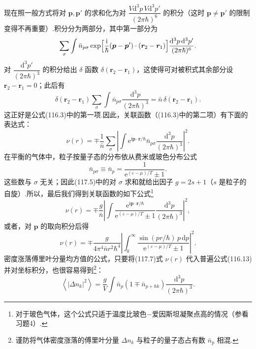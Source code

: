 现在照一般方式将对 $\boldsymbol{p},\boldsymbol{p}'$ 的求和化为对
$\dfrac{V\mathrm{d}^{3}p\,V\mathrm{d}^{3}p'}{(2\pi\hbar)^{6}}$ 的积分（这时
$\boldsymbol{p}\neq\boldsymbol{p}'$ 的限制变得不再重要）.积分分为两部分，其中第一部分为
\begin{equation*}
  \sum_{\sigma}\int\bar{n}_{p\sigma}
  \exp\Bigl[\frac{\mathrm{i}}{\hbar}
  (\boldsymbol{p}-\boldsymbol{p}')\cdot(\boldsymbol{r}_{2}-\boldsymbol{r}_{1})\Bigr]
  \frac{\mathrm{d}^{3}p\,\mathrm{d}^{3}p'}{(2\pi\hbar)^{6}}.
\end{equation*}
对 $\dfrac{\mathrm{d}^{3}p'}{(2\pi\hbar)^{3}}$ 的积分给出 $\delta$ 函数
$\delta(\boldsymbol{r}_{2}-\boldsymbol{r}_{1})$，这使得可对被积式其余部分设
$\boldsymbol{r}_{2}-\boldsymbol{r}_{1}=0$；此后有
\begin{equation*}
  \delta(\boldsymbol{r}_{2}-\boldsymbol{r}_{1})\sum_{\sigma}\int\bar{n}_{p\sigma}
  \frac{\mathrm{d}^{3}p}{(2\pi\hbar)^{3}}
  =\bar{n}\,\delta(\boldsymbol{r}_{2}-\boldsymbol{r}_{1}).
\end{equation*}
这正好是公式(116.3)中的第一项.因此，关联函数（(116.3)中的第二项）有下面的表达式：
\begin{equation}
  \nu(r)=\mp\frac{1}{\bar{n}}\sum_{\sigma}
  \left|\int\mathrm{e}^{\mathrm{i}\boldsymbol{p}\cdot\boldsymbol{r}/\hbar}
  \bar{n}_{p\sigma}\frac{\mathrm{d}^{3}p}{(2\pi\hbar)^{3}}\right|^{2}.
\end{equation}
在平衡的气体中，粒子按量子态的分布依从费米或玻色分布公式
\begin{equation}
  \bar{n}_{p\sigma}\equiv\bar{n}_{p}
  =\frac{1}{\mathrm{e}^{(\varepsilon-\mu)/T}\pm1}.
\end{equation}
这些数与 $\sigma$ 无关；因此(117.5)中的对 $\sigma$ 求和就给出因子 $g=2s+1$（$s$
是粒子的自旋）.所以，最后我们得到关联函数的如下公式\footnote{对于玻色气体，这个公式只适于温度比玻色−爱因斯坦凝聚点高的情况（参看习题4）.}
\begin{equation}
  \nu(r)=\mp\frac{g}{\bar{n}}
  \left|\int\frac{\mathrm{e}^{\mathrm{i}\boldsymbol{p}\cdot\boldsymbol{r}/\hbar}}
  {\mathrm{e}^{(\varepsilon-\mu)/T}\pm1}
  \frac{\mathrm{d}^{3}p}{(2\pi\hbar)^{3}}\right|^{2},
\end{equation}
或者，对 $\boldsymbol{p}$ 的取向积分后得
\begin{equation}
  \nu(r)=\mp\frac{g}{4\pi^{4}\bar{n}r^{2}\hbar^{4}}
  \left|\int_{0}^{\infty}
  \frac{\sin(pr/\hbar)\,p\,\mathrm{d}p}
  {\mathrm{e}^{(\varepsilon-\mu)/T}\pm1}\right|^{2}.
\end{equation}
密度涨落傅里叶分量均方值的公式，只要将(117.7)式 $\nu(r)$ 代入普遍公式(116.13)并对坐标积分，也很容易得到\footnote{谨防将气体密度涨落的傅里叶分量 $\Delta n_{k}$ 与粒子的量子态占有数 $\bar{n}_{p}$ 相混.}：
\begin{equation}
  \left\langle|\Delta n_{k}|^{2}\right\rangle
  =\frac{g}{V}\int\bar{n}_{p}(1\mp\bar{n}_{p+\hbar k})
  \frac{\mathrm{d}^{3}p}{(2\pi\hbar)^{3}}.
\end{equation}


